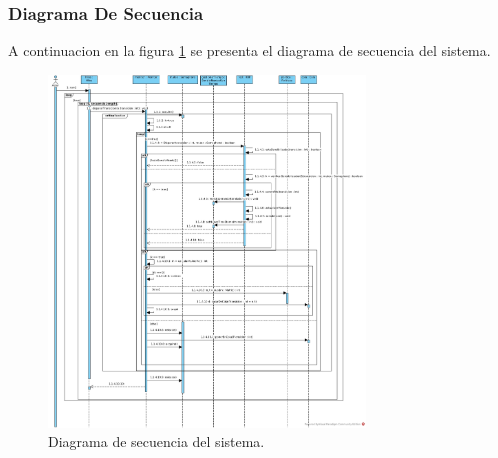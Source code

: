 \documentclass{article}
\begin{document}
		\subsubsection{Diagrama De Secuencia}
		A continuacion en la figura \ref{fig:mesh3} se presenta el diagrama de secuencia del sistema.
		\begin{figure}[H]
			\centering
			\includegraphics[width=0.75\textwidth]{Diagrama_de_secuencia}
			\caption{Diagrama de secuencia del sistema.}
			\label{fig:mesh3}
		\end{figure}
\end{document}
